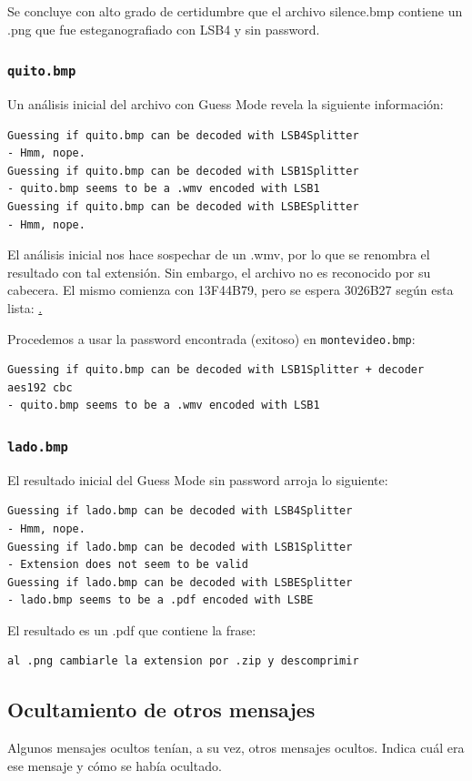 Se concluye con alto grado de certidumbre que el archivo silence.bmp contiene un .png que fue esteganografiado con LSB4 y sin password.

\subsubsection{\texttt{quito.bmp}}
Un análisis inicial del archivo con Guess Mode revela la siguiente información:

\begin{lstlisting}
Guessing if quito.bmp can be decoded with LSB4Splitter
- Hmm, nope.
Guessing if quito.bmp can be decoded with LSB1Splitter
- quito.bmp seems to be a .wmv encoded with LSB1
Guessing if quito.bmp can be decoded with LSBESplitter
- Hmm, nope.
\end{lstlisting}

El análisis inicial nos hace sospechar de un .wmv, por lo que se renombra el resultado con tal extensión. Sin embargo, el archivo no es reconocido por su cabecera. El mismo comienza con 13F44B79, pero se espera 3026B27 según esta lista: \href{https://en.wikipedia.org/wiki/List_of_file_signatures}.

Procedemos a usar la password encontrada (exitoso) en \texttt{montevideo.bmp}:
\begin{lstlisting}
Guessing if quito.bmp can be decoded with LSB1Splitter + decoder aes192 cbc
- quito.bmp seems to be a .wmv encoded with LSB1
\end{lstlisting}

\subsubsection{\texttt{lado.bmp}}
El resultado inicial del Guess Mode sin password arroja lo siguiente:

\begin{lstlisting}
Guessing if lado.bmp can be decoded with LSB4Splitter
- Hmm, nope.
Guessing if lado.bmp can be decoded with LSB1Splitter
- Extension does not seem to be valid
Guessing if lado.bmp can be decoded with LSBESplitter
- lado.bmp seems to be a .pdf encoded with LSBE
\end{lstlisting}

El resultado es un .pdf que contiene la frase:
\begin{lstlisting}
al .png cambiarle la extension por .zip y descomprimir
\end{lstlisting}

\subsection{Ocultamiento de otros mensajes}
\begin{displayquote}
Algunos mensajes ocultos tenían, a su vez, otros mensajes ocultos. Indica cuál era ese mensaje
y cómo se había ocultado.
\end{displayquote}

